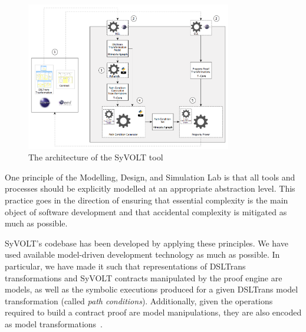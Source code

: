 \begin{figure}
\centering
\includegraphics[width=0.8\textwidth]{figures/syvolt_arch}
\caption{The architecture of the SyVOLT tool}
\label{fig:arch}
\end{figure}

One principle of the Modelling, Design, and Simulation Lab is that all tools and
processes should be explicitly modelled at an appropriate abstraction level.
This practice goes in the direction of ensuring that essential
complexity is the main object of software development and that accidental
complexity is mitigated as much as possible.

SyVOLT's codebase has been developed by applying these principles. We have used
available model-driven development technology as much as possible. In
particular, we have made it such that representations of DSLTrans transformations
and SyVOLT contracts manipulated by the proof engine are models, as well as the
symbolic executions produced for a given DSLTrans model transformation (called
\emph{path conditions}). Additionally, given the operations required to build a
contract proof are model manipulations, they are also encoded as model
transformations~\cite{LucioVang}.\\


